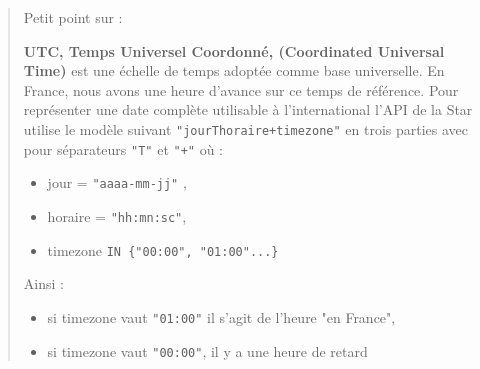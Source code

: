 \documentclass[11pt,a4paper]{article}
\begin{document}
\begin{quote}
    Petit point sur :
    
    \textbf{UTC, Temps Universel Coordonné, (Coordinated Universal Time)}
    est une échelle de temps adoptée comme base universelle.
    En France, nous avons une heure d'avance sur ce temps de référence.
    Pour représenter une date complète utilisable à l'international
    l'API de la Star utilise le modèle suivant
    \verb|"jourThoraire+timezone"| en trois parties avec pour séparateurs \verb+"T"+ et \verb|"+"|
    où :
    
    \begin{itemize}
        \item jour = \verb+"aaaa-mm-jj"+ ,
        \item  horaire = \verb+"hh:mn:sc"+,
        \item  timezone \verb+IN {"00:00", "01:00"...}+
    \end{itemize}

    Ainsi :
    
    \begin{itemize}
        \item si timezone vaut \verb+"01:00"+ il s'agit de l'heure "en France",
        \item si timezone vaut \verb+"00:00"+, il y a une heure de retard
    \end{itemize}
\end{quote}
\end{document}
